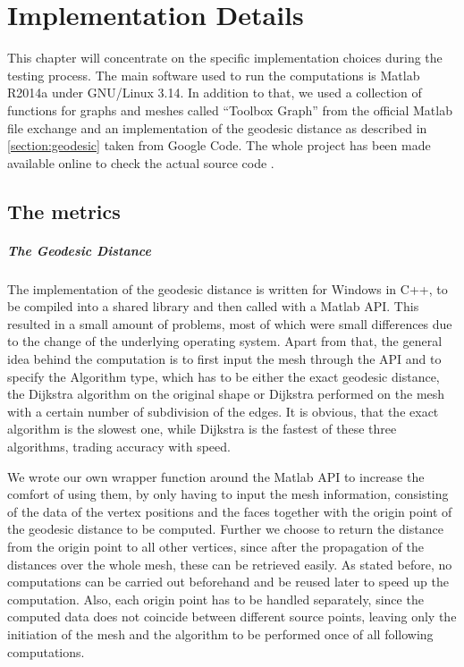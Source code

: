 \chapter{Implementation Details}
\label{chapter:implementation}

This chapter will concentrate on the specific implementation choices during the testing process.
The main software used to run the computations is Matlab R2014a under GNU/Linux 3.14.
In addition to that, we used a collection of functions for graphs and meshes called ``Toolbox Graph'' from the official Matlab file exchange\cite{online_toolbox} and an implementation of the geodesic distance as described in \ref{section:geodesic} taken from Google Code\cite{online_geodesic}.
The whole project has been made available online to check the actual source code \cite{online_github}.

\section{The metrics}
\paragraph{The Geodesic Distance}
The implementation of the geodesic distance is written for Windows in C++, to be compiled into a shared library and then called with a Matlab API.
This resulted in a small amount of problems, most of which were small differences due to the change of the underlying operating system.
Apart from that, the general idea behind the computation is to first input the mesh through the API and to specify the Algorithm type, which has to be either the exact geodesic distance, the Dijkstra algorithm on the original shape or Dijkstra performed on the mesh with a certain number of subdivision of the edges.
It is obvious, that the exact algorithm is the slowest one, while Dijkstra is the fastest of these three algorithms, trading accuracy with speed.

We wrote our own wrapper function around the Matlab API to increase the comfort of using them, by only having to input the mesh information, consisting of the data of the vertex positions and the faces together with the origin point of the geodesic distance to be computed.
Further we choose to return the distance from the origin point to all other vertices, since after the propagation of the distances over the whole mesh, these can be retrieved easily.
As stated before, no computations can be carried out beforehand and be reused later to speed up the computation.
Also, each origin point has to be handled separately, since the computed data does not coincide between different source points, leaving only the initiation of the mesh and the algorithm to be performed once of all following computations.

